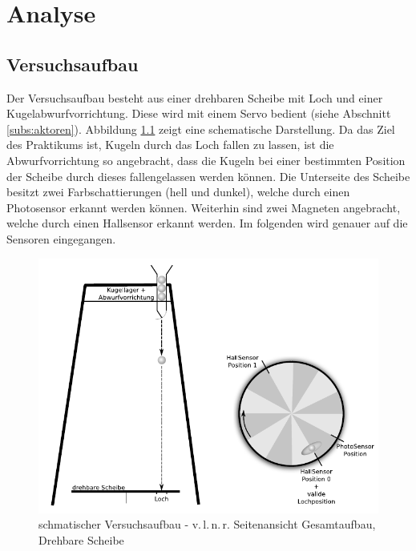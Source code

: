 \chapter{Analyse}\label{k_analyse}

\section{Versuchsaufbau}

Der Versuchsaufbau besteht aus einer drehbaren Scheibe mit Loch und einer Kugelabwurfvorrichtung.
Diese wird mit einem Servo bedient (siehe Abschnitt \ref{subs:aktoren}).
Abbildung \ref{img:versuchsaufbau} zeigt eine schematische Darstellung.
Da das Ziel des Praktikums ist, Kugeln durch das Loch fallen zu lassen, ist die Abwurfvorrichtung so angebracht, dass die Kugeln bei einer bestimmten Position der Scheibe durch dieses fallengelassen werden können.
Die Unterseite des Scheibe besitzt zwei Farbschattierungen (hell und dunkel), welche durch einen Photosensor erkannt werden können.
Weiterhin sind zwei Magneten angebracht, welche durch einen Hallsensor erkannt werden.
Im folgenden wird genauer auf die Sensoren eingegangen.



\begin{figure}[h] \centering
	\includegraphics[width=\textwidth]{images/aufbau.pdf}
	\caption{schmatischer Versuchsaufbau - v.\,l.\,n.\,r. Seitenansicht Gesamtaufbau, Drehbare Scheibe}
	\label{img:versuchsaufbau}
\end{figure}

